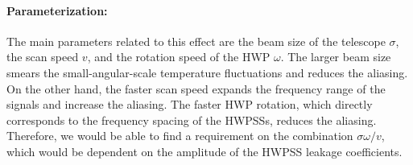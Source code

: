 \paragraph{Parameterization:}
The main parameters related to this effect are the beam size of the telescope $\sigma$, the scan speed $v$, and the rotation speed of the HWP $\omega$.
The larger beam size smears the small-angular-scale temperature fluctuations and reduces the aliasing.
On the other hand, the faster scan speed expands the frequency range of the signals and increase the aliasing.
The faster HWP rotation, which directly corresponds to the frequency spacing of the HWPSSs, reduces the aliasing.
Therefore, we would be able to find a requirement on the combination $\sigma\omega/v$, which would be dependent on the amplitude of the HWPSS leakage coefficients. 
